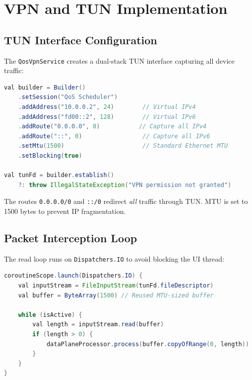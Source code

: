\section{VPN and TUN Implementation}
\label{sec:vpn_implementation}

\subsection{TUN Interface Configuration}

The \texttt{QosVpnService} creates a dual-stack TUN interface capturing all device traffic:

\begin{lstlisting}[language=Java, caption={TUN interface configuration with dual-stack support}, label={lst:vpn_builder}]
val builder = Builder()
    .setSession("QoS Scheduler")
    .addAddress("10.0.0.2", 24)        // Virtual IPv4
    .addAddress("fd00::2", 128)        // Virtual IPv6
    .addRoute("0.0.0.0", 0)           // Capture all IPv4
    .addRoute("::", 0)                 // Capture all IPv6
    .setMtu(1500)                      // Standard Ethernet MTU
    .setBlocking(true)

val tunFd = builder.establish()
    ?: throw IllegalStateException("VPN permission not granted")
\end{lstlisting}

The routes \texttt{0.0.0.0/0} and \texttt{::/0} redirect \textit{all} traffic through TUN. MTU is set to 1500 bytes to prevent IP fragmentation.

\subsection{Packet Interception Loop}

The read loop runs on \texttt{Dispatchers.IO} to avoid blocking the UI thread:

\begin{lstlisting}[language=Java, caption={Packet interception loop with buffer reuse}, label={lst:intercept_loop}]
coroutineScope.launch(Dispatchers.IO) {
    val inputStream = FileInputStream(tunFd.fileDescriptor)
    val buffer = ByteArray(1500) // Reused MTU-sized buffer

    while (isActive) {
        val length = inputStream.read(buffer)
        if (length > 0) {
            dataPlaneProcessor.process(buffer.copyOfRange(0, length))
        }
    }
}
\end{lstlisting}

